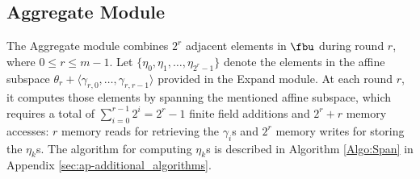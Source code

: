 














\subsection{Aggregate Module}

The \textsf{Aggregate} module combines $2^r$ adjacent elements in $\fbu$ during round $r$, where $0 \leq r \leq m-1$. Let $\{\eta_0, \eta_1, \ldots, \eta_{2^{r}-1} \}$ denote the elements in the affine subspace $\theta_r + \langle \gamma_{r,0}, \ldots, \gamma_{r,r-1} \rangle$ provided in the \textsf{Expand} module. At each round $r$, it computes those elements by spanning the mentioned affine subspace, which requires a total of $\sum_{i=0}^{r-1} 2^i = 2^r -1$ finite field additions and $2^r + r$ memory accesses: $r$ memory reads for retrieving the $\gamma_i$s and $2^r$ memory writes for storing the $\eta_k$s. The algorithm for computing $\eta_k$s is described in Algorithm \ref{Algo:Span} in Appendix \ref{sec:ap-additional_algorithms}.


